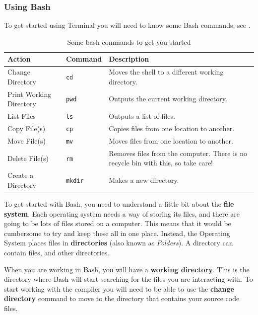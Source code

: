 \clearpage
\subsubsection{Using Bash} %
\label{ssub:bash}

To get started using Terminal you will need to know some Bash commands, see .

\begin{table}[h]
  \centering
  \begin{tabular}{|l|l|p{5cm}|}
    \hline
    \textbf{Action} & \textbf{Command} & \textbf{Description} \\
    \hline
    Change Directory & \texttt{cd} & Moves the shell to a different working directory. \\
    \hline
    Print Working Directory & \texttt{pwd} & Outputs the current working directory.\\
    \hline
    List Files & \texttt{ls} & Outputs a list of files.\\
    \hline
    Copy File(s) & \texttt{cp} & Copies files from one location to another.\\
    \hline
    Move File(s) & \texttt{mv} & Moves files from one location to another.\\
    \hline
    Delete File(s) & \texttt{rm} & Removes files from the computer. There is no recycle bin with this, so take care!\\
    \hline
    Create a Directory & \texttt{mkdir} & Makes a new directory. \\
    \hline
  \end{tabular}
  \caption{Some bash commands to get you started}
  \label{tbl:bash-commands}
\end{table}

To get started with Bash, you need to understand a little bit about the \textbf{file system}. Each operating system needs a way of storing its files, and there are going to be lots of files stored on a computer. This means that it would be cumbersome to try and keep these all in one place. Instead, the Operating System places files in \textbf{directories} (also known as \emph{Folders}). A directory can contain files, and other directories. 

When you are working in Bash, you will have a \textbf{working directory}. This is the directory where Bash will start searching for the files you are interacting with. To start working with the compiler you will need to be able to use the \textbf{change directory} command to move to the directory that contains your source code files.

